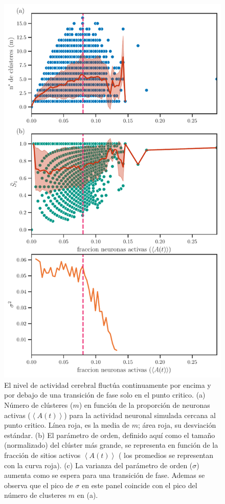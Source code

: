 \begin{figure}[h!]
	\centering\includegraphics[width=\imsize]{estadisticas_clusteres_modelo.pdf}
	\caption[ El nivel de actividad cerebral fluctúa continuamente por encima y por debajo de una transición de fase solo en el punto critico.] {El nivel de actividad cerebral fluctúa continuamente por encima y por debajo de una transición de fase solo en el punto critico.  (a) Número de clústeres ($m$) en función de la proporción de neuronas activas ($\left\langle A(t) \right\rangle$) para la actividad neuronal simulada cercana al punto critico. Línea roja, es la media de $m$; área roja, su desviación estándar.  (b)   El parámetro de orden, definido aquí como el tamaño (normalizado) del clúster más grande, se representa en función de la fracción de sitios activos $\left\langle A(t) \right\rangle$ ( los promedios se representan con la curva roja).   (c) La varianza del parámetro de orden ($\sigma$) aumenta como se espera para una transición de fase. Ademas se observa que el pico de $\sigma$ en este panel coincide con el pico del número de clusteres $m$  en  (a). } \label{fig:estadisticas_clusteres_modelo}
\end{figure}




